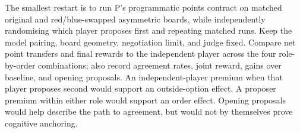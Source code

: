 \documentclass{article}
\begin{document}
The smallest restart is to run P's programmatic points contract on matched original and red/blue-swapped
asymmetric boards, while independently randomising which player proposes first and repeating matched runs.
Keep the model pairing, board geometry, negotiation limit, and judge fixed. Compare net point transfers and
final rewards to the independent player across the four role-by-order combinations; also record agreement
rates, joint reward, gains over baseline, and opening proposals. An independent-player premium when that
player proposes second would support an outside-option effect. A proposer premium within either role would
support an order effect. Opening proposals would help describe the path to agreement, but would not by
themselves prove cognitive anchoring.



\end{document}
